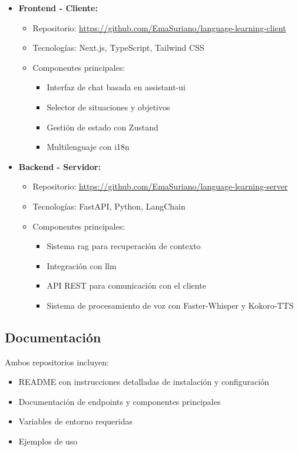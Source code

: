 \begin{itemize}
    \item \textbf{Frontend - Cliente:}
    \begin{itemize}
        \item Repositorio: \url{https://github.com/EmaSuriano/language-learning-client}
        \item Tecnologías: Next.js, TypeScript, Tailwind CSS
        \item Componentes principales:
              \begin{itemize}
                  \item Interfaz de chat basada en \gls{assistant-ui}
                  \item Selector de situaciones y objetivos
                  \item Gestión de estado con Zustand
                  \item Multilenguaje con i18n
              \end{itemize}
    \end{itemize}

    \item \textbf{Backend - Servidor:}
    \begin{itemize}
        \item Repositorio: \url{https://github.com/EmaSuriano/language-learning-server}
        \item Tecnologías: FastAPI, Python, LangChain
        \item Componentes principales:
              \begin{itemize}
                  \item Sistema \gls{rag} para recuperación de contexto
                  \item Integración con \gls{llm}
                  \item API REST para comunicación con el cliente
                  \item Sistema de procesamiento de voz con Faster-Whisper y Kokoro-TTS
              \end{itemize}
    \end{itemize}
\end{itemize}

\subsection{Documentación}
\label{documentacion-repositorios}

Ambos repositorios incluyen:
\begin{itemize}
    \item README con instrucciones detalladas de instalación y configuración
    \item Documentación de endpoints y componentes principales
    \item Variables de entorno requeridas
    \item Ejemplos de uso
\end{itemize}


